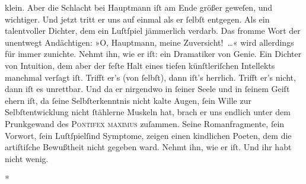 {{                  klein. Aber die Schlacht bei Hauptmann iſt
                  am Ende größer geweſen, und wichtiger. Und jetzt tritt er uns auf einmal als er{ }ſelbſt entgegen. Als ein talentvoller Dichter, dem ein Luſtſpiel jämmerlich
                  verdarb. Das fromme Wort der unentwegt Andächtigen: »O, Hauptmann, meine Zuversicht! {\dots}«
                  wird allerdings für immer zunichte. Nehmt ihn, wie er iſt: ein Dramatiker von
                  Genie. Ein Dichter von Intuition, dem aber der feſte Halt eines tiefen
                  künſtleriſchen Intellekts manchmal verſagt iſt. Trifft er’s (von{ }ſelbſt), dann
                  iſt’s herrlich. Trifft er’s nicht, dann iſt es unrettbar. Und da er nirgendwo in{ }ſeiner Seele und in{ }ſeinem Geiſt ehern iſt, da{ }ſeine Selbſterkenntnis nicht kalte
                  Augen,{ }ſein Wille zur Selbſtentwicklung nicht{ }ſtählerne Muskeln hat, brach er uns
                  endlich unter dem Prunkgewand des \textsc{Pontifex maximus}
                  zuſammen. Seine Romanfragmente,{ }ſein Vorwort,{ }ſein Luſtſpielſind Symptome, zeigen einen kindlichen Poeten, dem die
                  artiſtiſche Bewußtheit nicht gegeben ward. Nehmt ihn, wie er iſt. Und ihr habt
                  nicht wenig.}}\pend
           
\pstart
           \centering{}\textcolor{gray}{\textbf{*}}\pend
           
